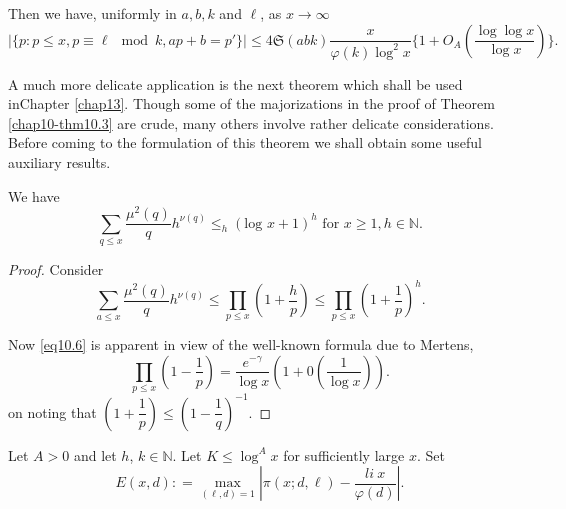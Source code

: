 Then we have, uniformly in $a,b,k$ and $\ell$, as $x \to \infty$
{\fontsize{10pt}{12pt}\selectfont
\begin{equation*}
|\{ p:p \leq x, p \equiv \ell  \mod  k, ap+b = p' \}| \leq 4
\mathfrak{S} (abk) \frac{x}{\varphi(k)\log^2 x} \{ 1+O_A (\frac{\log
  \log x}{\log x}) \}.\tag{10.5}\label{eq10.5}  
\end{equation*}}\relax

A much more delicate application is the next theorem which shall be used 
in\pageoriginale Chapter \ref{chap13}. Though some of the
majorizations in the proof of Theorem \ref{chap10-thm10.3} are crude,
many others 
involve rather delicate considerations. Before coming to the
formulation of this theorem we shall obtain some useful auxiliary
results. 

\setcounter{lemma}{0}
\begin{lemma}\label{chap10-lem10.1} 
We have
\begin{equation*}
\sum_{q \le x} \frac{\mu^2(q)}{q} h^{\nu (q)} \leq_{h} ( \text {
  log } x + 1)^h \text { for } x \ge 1, h \in
\mathbb{N}. \tag{10.6}\label{eq10.6}  
\end{equation*}
\end{lemma}

\begin{proof}
Consider
\begin{equation*}
\sum_{a \le x} \frac{\mu^2 (q)}{q} h^{\nu (q)} \le \prod_{p \le x} (1
+ \frac{h}{p}) \le \prod_{p \le x} (1 +
\frac{1}{p})^h. \tag{10.7}\label{eq10.7} 
\end{equation*}
 
Now \eqref{eq10.6} is apparent in view of the well-known formula due
to Mertens, 
\begin{equation*}
\prod_{p \le x} (1-\frac{1}{p}) = \frac{e^{-\gamma }}{\log x} (1 + 0
(\frac {1}{\log x})). \tag{10.8}\label{eq10.8} 
\end{equation*}
on noting that $(1 + \dfrac{1}{p}) \le (1 - \dfrac{1}{q})^{-1}$.
\end{proof}

\begin{lemma}\label{chap10-lem10.2}%
Let $A > 0$ and let $h$, $k \in \mathbb{N}$. Let $K \le \log^A x$ for
sufficiently large $x$. Set 
\begin{equation*}
E(x, d) : = \underset{(\ell, d)=1}{\max} |\pi (x; d, \ell) - \frac{li\
  x}{\varphi (d)} |. \tag{10.9}\label{eq10.9} 
\end{equation*}
\end{lemma}

